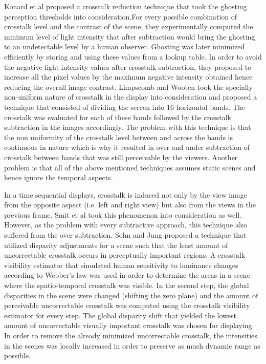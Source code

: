  Konard et al \cite{konrad2000cancellation} proposed a crosstalk reduction technique that took the ghosting perception thresholds into consideration.For every possible combination of crosstalk level and the contrast of the scene, they experimentally computed the minimum level of light intensity that after subtraction would bring the ghosting to an undetectable level by a human observer. Ghosting was later minimized efficiently by storing and using these values from a lookup table. In order to avoid the negative light intensity values after crosstalk subtraction, they proposed to increase all the pixel values by the maximum negative intensity obtained hence reducing the overall image contrast. Limpscomb and Wooten \cite{lipscomb1994reducing} took the specially non-uniform nature of crosstalk in the display into consideration and proposed a technique that consisted of dividing the screen into 16 horizontal bands. The crosstalk was evaluated for each of these bands followed by the crosstalk subtraction in the images accordingly. The problem with this technique is that the non uniformity of the crosstalk level between and across the bands is continuous in nature which is why it resulted in over and under subtraction of crosstalk between bands that was still perceivable by the viewers. Another problem is that all of the above mentioned techniques assumes static scenes and hence ignore the temporal aspects.

 In a time sequential displays, crosstalk is induced not only by the view image from the opposite aspect (i.e. left and right view) but also from the views in the previous frame. Smit et al \cite{smit2007non} took this phenomenon into consideration as well. However, as the problem with every subtractive approach, this technique also suffered from the over subtraction. Sohn and Jung \cite{sohn2014crosstalk} proposed a technique that utilized disparity adjustments for a scene such that the least amount of uncorrectable crosstalk occurs in perceptually important regions. A crosstalk visibility estimator that simulated human sensitivity to luminance changes according to Webber's law was used in order to determine the areas in a scene where the spatio-temporal crosstalk was visible. In the second step, the global disparities in the scene were changed (shifting the zero plane) and the amount of perceivable uncorrectable crosstalk was computed using the crosstalk visibility estimator for every step. The global disparity shift that yielded the lowest amount of uncorrectable visually important crosstalk was chosen for displaying. In order to remove the already minimized uncorrectable crosstalk, the intensities in the scenes was locally increased in order to preserve as much dynamic range as possible.

